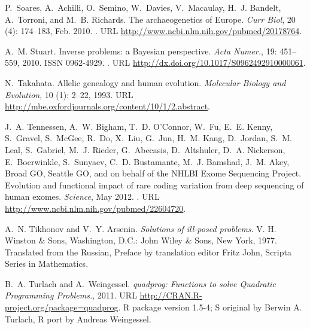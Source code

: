 \documentclass{article}
\begin{document}
\begin{thebibliography}{76}
P.~Soares, A.~Achilli, O.~Semino, W.~Davies, V.~Macaulay, H.~J. Bandelt,
  A.~Torroni, and M.~B. Richards.
\newblock The archaeogenetics of {Europe}.
\newblock \emph{Curr Biol}, 20 (4): 174--183, Feb. 2010.
\newblock {}.
\newblock URL \url{http://www.ncbi.nlm.nih.gov/pubmed/20178764}.

A.~M. Stuart.
\newblock Inverse problems: a {Bayesian} perspective.
\newblock \emph{Acta Numer.}, 19: 451--559, 2010.
\newblock ISSN 0962-4929.
\newblock {}.
\newblock URL \url{http://dx.doi.org/10.1017/S0962492910000061}.

N.~Takahata.
\newblock Allelic genealogy and human evolution.
\newblock \emph{Molecular Biology and Evolution}, 10 (1):
  2--22, 1993.
\newblock URL \url{http://mbe.oxfordjournals.org/content/10/1/2.abstract}.

J.~A. Tennessen, A.~W. Bigham, T.~D. O'Connor, W.~Fu, E.~E. Kenny, S.~Gravel,
  S.~McGee, R.~Do, X.~Liu, G.~Jun, H.~M. Kang, D.~Jordan, S.~M. Leal,
  S.~Gabriel, M.~J. Rieder, G.~Abecasis, D.~Altshuler, D.~A. Nickerson,
  E.~Boerwinkle, S.~Sunyaev, C.~D. Bustamante, M.~J. Bamshad, J.~M. Akey,
  {Broad GO}, {Seattle GO}, and {on behalf of the NHLBI Exome Sequencing
  Project}.
\newblock Evolution and functional impact of rare coding variation from deep
  sequencing of human exomes.
\newblock \emph{Science}, May 2012.
\newblock {}.
\newblock URL \url{http://www.ncbi.nlm.nih.gov/pubmed/22604720}.

A.~N. Tikhonov and V.~Y. Arsenin.
\newblock \emph{Solutions of ill-posed problems}.
\newblock V. H. Winston \& Sons, Washington, D.C.: John Wiley \& Sons, New
  York, 1977.
\newblock Translated from the Russian, Preface by translation editor Fritz
  John, Scripta Series in Mathematics.

B.~A. Turlach and A.~Weingessel.
\newblock \emph{quadprog: Functions to solve Quadratic Programming Problems.},
  2011.
\newblock URL \url{http://CRAN.R-project.org/package=quadprog}.
\newblock R package version 1.5-4; S original by Berwin A. Turlach, R port by
  Andreas Weingessel.


\end{thebibliography}
\end{document}
